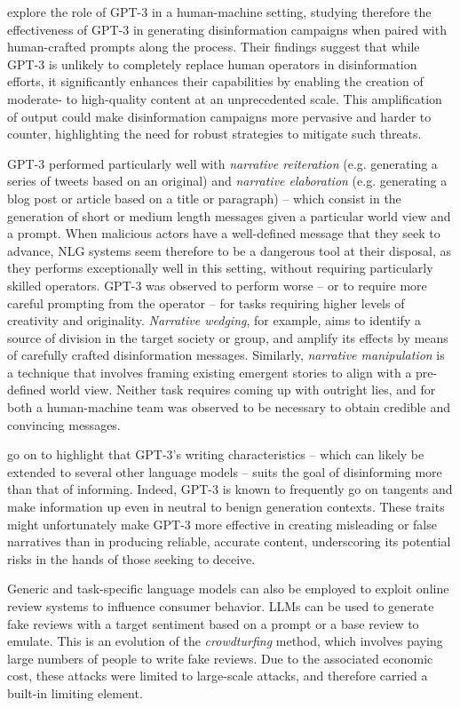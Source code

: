 \citet{buchanan2021truth} explore the role of GPT-3 in a human-machine setting, studying therefore the effectiveness of GPT-3 in generating disinformation campaigns when paired with human-crafted prompts along the process.
Their findings suggest that while GPT-3 is unlikely to completely replace human operators in disinformation efforts, it significantly enhances their capabilities by enabling the creation of moderate- to high-quality content at an unprecedented scale.
This amplification of output could make disinformation campaigns more pervasive and harder to counter, highlighting the need for robust strategies to mitigate such threats.

GPT-3 performed particularly well with \emph{narrative reiteration} (e.g. generating a series of tweets based on an original) and \emph{narrative elaboration} (e.g. generating a blog post or article based on a title or paragraph) -- which consist in the generation of short or medium length messages given a particular world view and a prompt.
When malicious actors have a well-defined message that they seek to advance, NLG systems seem therefore to be a dangerous tool at their disposal, as they performs exceptionally well in this setting, without requiring particularly skilled operators.
GPT-3 was observed to perform worse -- or to require more careful prompting from the operator -- for tasks requiring higher levels of creativity and originality.
\emph{Narrative wedging}, for example, aims to identify a source of division in the target society or group, and amplify its effects by means of carefully crafted disinformation messages.
Similarly, \emph{narrative manipulation} is a technique that involves framing existing emergent stories to align with a pre-defined world view.
Neither task requires coming up with outright lies, and for both a human-machine team was observed to be necessary to obtain credible and convincing messages.

\citet{buchanan2021truth} go on to highlight that GPT-3's writing characteristics -- which can likely be extended to several other language models -- suits the goal of disinforming more than that of informing.
Indeed, GPT-3 is known to frequently go on tangents and make information up even in neutral to benign generation contexts.
These traits might unfortunately make GPT-3 more effective in creating misleading or false narratives than in producing reliable, accurate content, underscoring its potential risks in the hands of those seeking to deceive.

Generic and task-specific language models can also be employed to exploit online review systems to influence consumer behavior. LLMs can be used to generate fake reviews with a target sentiment based on a prompt or a base review to emulate.
This is an evolution of the \emph{crowdturfing} method, which involves paying large numbers of people to write fake reviews.
Due to the associated economic cost, these attacks were limited to large-scale attacks, and therefore carried a built-in limiting element.

